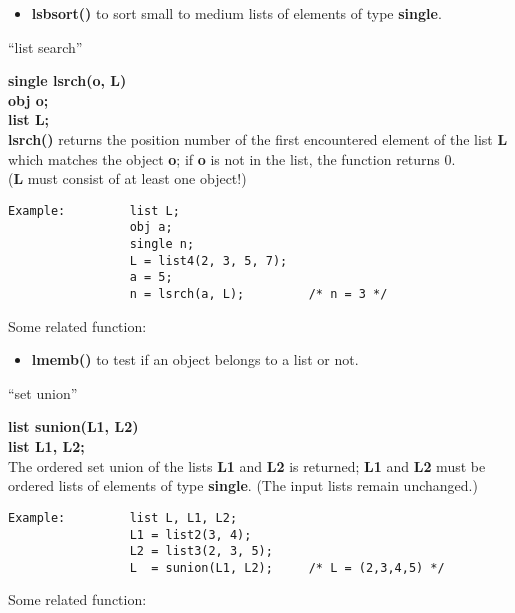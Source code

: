 \begin{itemize}
\item[] {\bf lsbsort()} to sort small to medium lists of elements of type {\bf single}.
\end{itemize}

\leer
\begin{center} ``list search'' \end{center}
{\bf single lsrch(o, L)\\
obj o;\\
list L;}\\[2ex]
{\bf lsrch()} returns the position number of the first encountered element of the list
{\bf L} which matches the object {\bf o}; if {\bf o} is not in the list, the function
returns 0.\\
({\bf L} must consist of at least one object!)

\begin{verbatim}
Example:         list L;
                 obj a;
                 single n;
                 L = list4(2, 3, 5, 7);
                 a = 5;
                 n = lsrch(a, L);         /* n = 3 */

\end{verbatim}

Some related function:

\begin{itemize}
\item[] {\bf lmemb()} to test if an object belongs to a list or not.
\end{itemize}

\newpage

\begin{center} ``set union'' \end{center}
{\bf list sunion(L1, L2)\\
list L1, L2;}\\[2ex]
The ordered set union of the lists {\bf L1} and {\bf L2} is returned; {\bf L1} and {\bf L2} must be ordered
lists of elements of type {\bf single}. (The input lists remain unchanged.)

\begin{verbatim}
Example:         list L, L1, L2;
                 L1 = list2(3, 4);
                 L2 = list3(2, 3, 5);
                 L  = sunion(L1, L2);     /* L = (2,3,4,5) */
\end{verbatim}

Some related function:

